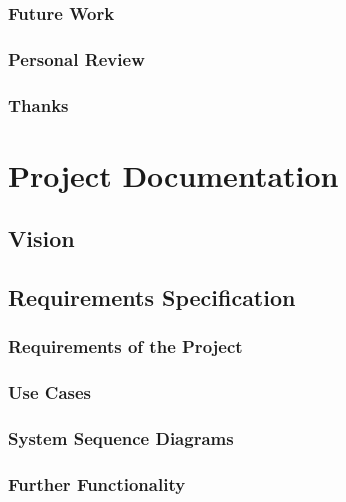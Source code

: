 \documentclass[a4paper,parskip=full]{scrreprt}
\begin{document}
\section{Future Work}

\section{Personal Review}

\section{Thanks}



\part{Project Documentation}


\chapter{Vision}


\chapter{Requirements Specification}

\section{Requirements of the Project}

\section{Use Cases}

\section{System Sequence Diagrams}

\section{Further Functionality}
\end{document}
